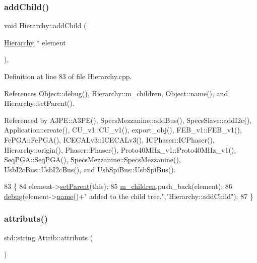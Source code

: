 \subsubsection{\texorpdfstring{add\+Child()}{addChild()}}
{\footnotesize\ttfamily void Hierarchy\+::add\+Child (\begin{DoxyParamCaption}\item[{\hyperlink{classHierarchy}{Hierarchy} $\ast$}]{element }\end{DoxyParamCaption})\hspace{0.3cm}{\ttfamily [virtual]}, {\ttfamily [inherited]}}



Definition at line 83 of file Hierarchy.\+cpp.



References Object\+::debug(), Hierarchy\+::m\+\_\+children, Object\+::name(), and Hierarchy\+::set\+Parent().



Referenced by A3\+P\+E\+::\+A3\+P\+E(), Specs\+Mezzanine\+::add\+Bus(), Specs\+Slave\+::add\+I2c(), Application\+::create(), C\+U\+\_\+v1\+::\+C\+U\+\_\+v1(), export\+\_\+obj(), F\+E\+B\+\_\+v1\+::\+F\+E\+B\+\_\+v1(), Fe\+P\+G\+A\+::\+Fe\+P\+G\+A(), I\+C\+E\+C\+A\+Lv3\+::\+I\+C\+E\+C\+A\+Lv3(), I\+C\+Phaser\+::\+I\+C\+Phaser(), Hierarchy\+::origin(), Phaser\+::\+Phaser(), Proto40\+M\+Hz\+\_\+v1\+::\+Proto40\+M\+Hz\+\_\+v1(), Seq\+P\+G\+A\+::\+Seq\+P\+G\+A(), Specs\+Mezzanine\+::\+Specs\+Mezzanine(), Usb\+I2c\+Bus\+::\+Usb\+I2c\+Bus(), and Usb\+Spi\+Bus\+::\+Usb\+Spi\+Bus().


\begin{DoxyCode}
83                                           \{
84   element->\hyperlink{classHierarchy_a585ad1aeec16077a0e532ab8b4fc557b}{setParent}(\textcolor{keyword}{this});
85   \hyperlink{classHierarchy_a038816763941fd4a930504917f60483b}{m\_children}.push\_back(element);
86   \hyperlink{classObject_aac010553f022165573714b7014a15f0d}{debug}(element->\hyperlink{classObject_a300f4c05dd468c7bb8b3c968868443c1}{name}()+\textcolor{stringliteral}{" added to the child tree."},\textcolor{stringliteral}{"Hierarchy::addChild"});
87 \}
\end{DoxyCode}
\mbox{\label{classAttrib_aee7bbf16b144887f196e1341b24f8a26}} 
\subsubsection{\texorpdfstring{attributs()}{attributs()}}
{\footnotesize\ttfamily std\+::string Attrib\+::attributs (\begin{DoxyParamCaption}{ }\end{DoxyParamCaption})\hspace{0.3cm}{\ttfamily [inherited]}}

